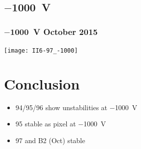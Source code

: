 \documentclass[9pt]{beamer}
\begin{document}
\subsection{$-$\SI{1000}{V}}
\begin{frame}
	\frametitle{$-$\SI{1000}{V} October 2015}
	\vspace*{-15pt}
	\begin{center}
		\texttt{[image: II6-97\_-1000]}
	\end{center}
\end{frame}
\section{Conclusion}
\begin{frame}
	\begin{minipage}[c][.4\textheight]{\textwidth}
		\begin{itemize}
			\setlength{\itemsep}{\fill}
			\item 94/95/96 show unstabilities at $-$\SI{1000}{V}
			\item 95 stable as pixel at $-$\SI{1000}{V}
			\item 97 and B2 (Oct) stable
		\end{itemize}
	\end{minipage}
\end{frame}
\end{document}

